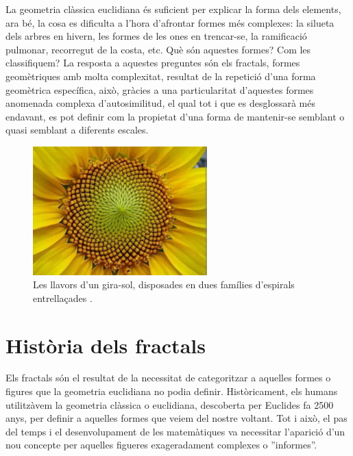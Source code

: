 \documentclass[12pt,a4paper]{report}
\begin{document}
La geometria clàssica euclidiana és suficient per explicar la forma dels elements, ara bé, la cosa es dificulta a l'hora d'afrontar formes més complexes: la silueta dels arbres en hivern, les formes de les ones en trencar-se, la ramificació pulmonar, recorregut de la costa, etc. Què són aquestes formes? Com les classifiquem? La resposta a aquestes preguntes són els fractals, formes geomètriques amb molta complexitat, resultat de la repetició d’una forma geomètrica específica, això, gràcies a una particularitat d'aquestes formes anomenada complexa d’autosimilitud, el qual tot i que es desglossarà més endavant, es pot definir com la propietat d'una forma de mantenir-se semblant o quasi semblant a diferents escales.
\begin{figure}[ht!]
\centering
\includegraphics[width=0.6\textwidth]{img/img01_01_girasol}
\caption{Les llavors d'un gira-sol, disposades en dues famílies d'espirals entrellaçades \cite{HistoriaFractales}.}
\label{img01_01}
\end{figure}
\section{Història dels fractals}
Els fractals són el resultat de la necessitat de categoritzar a aquelles formes o figures que la geometria euclidiana no podia definir. Històricament, els humans utilitzàvem la geometria clàssica o euclidiana, descoberta per Euclides fa 2500 anys, per definir a aquelles formes que veiem del nostre voltant. Tot i això, el pas del temps i el desenvolupament de les matemàtiques va necessitar l'aparició d’un nou concepte per aquelles figueres exageradament complexes o ''informes''.
\end{document}
